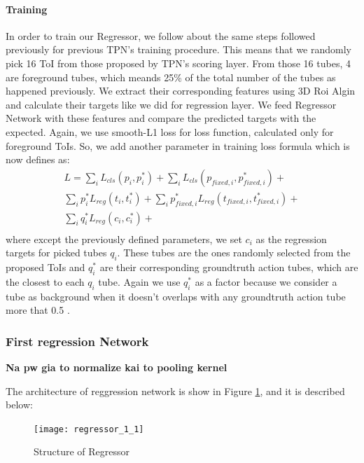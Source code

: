 \paragraph{ Training}
In order to train our Regressor, we follow about the same steps followed previously for previous TPN's training procedure. This means that
we randomly pick 16 ToI from those proposed by TPN's scoring layer. From those 16 tubes, 4 are foreground tubes, which meands 25\% of the total
number of the tubes as happened previously. We extract their corresponding features using 3D Roi Algin and calculate their targets like
we did for regression layer. We feed Regressor Network with these features and compare the predicted targets with the expected.
Again, we use smooth-L1 loss for loss function, calculated only for foreground ToIs. So, we add another parameter in
training loss formula which is now defines as:
\begin{equation} 
\begin{split}
 L  =  \sum_iL_{cls}(p_i, p_i^*) + \sum_iL_{cls}(p_{fixed,i}, p_{fixed,i}^*) + \\
 \sum_ip_i^*L_{reg}(t_i,t_i^*) + \sum_ip_{fixed,i}^*L_{reg}(t_{fixed,i},t_{fixed,i}^*) + \\
  \sum_iq_i^*L_{reg}(c_{i}, c_{i}^*) + \\
\end{split}
\end{equation}
where  except the previously defined parameters, we set  $c_{i} $ as the regression targets for picked tubes $q_i$.
These tubes are the ones randomly selected from the proposed ToIs and $q_i^*$ are their corresponding groundtruth action tubes, which are the closest to each $q_i$ tube.
Again we use $q_i^*$ as a factor because we consider a tube as background when it doesn't overlaps with any groundtruth action tube more that 0.5 .

\subsubsection{First regression Network} \textbf{Na pw gia to normalize kai to pooling kernel}\par
The architecture of reggression network is show in Figure \ref{fig:regressor_3d}, and it is described below:
\begin{figure}[h]
  \centering
  \texttt{[image: regressor\_1\_1]}
  \caption{Structure of Regressor}
  \label{fig:regressor_3d}
\end{figure}

